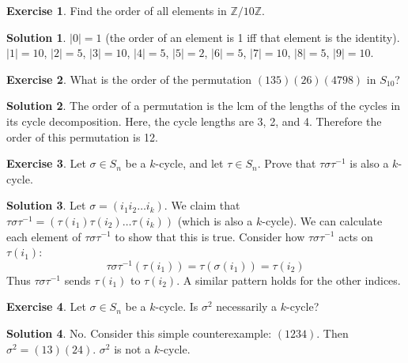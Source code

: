 \documentclass[12pt]{article}
\theoremstyle{definition}
\newtheorem{exercise}{Exercise}
\theoremstyle{definition}
\newtheorem{solution}{Solution}
\newcommand{\Z}{\mathbb{Z}}
\begin{document}
\begin{exercise}
Find the order of all elements in $\Z / 10 \Z$.
\end{exercise}
\begin{solution}
$|0| = 1$ (the order of an element is 1 iff that element is the identity). $|1| = 10$, $|2| = 5$, $|3| = 10$, $|4| = 5$, $|5|=2$, $|6| = 5$, $|7|=10$, $|8|=5$, $|9|=10$.
\end{solution}

\begin{exercise}
What is the order of the permutation $(1 3 5)(2 6)(4 7 9 8)$ in $S_{10}$?
\end{exercise}
\begin{solution}
The order of a permutation is the lcm of the lengths of the cycles in its cycle decomposition. Here, the cycle lengths are 3, 2, and 4. Therefore the order of this permutation is 12.
\end{solution}

\begin{exercise}
Let $\sigma \in S_n$ be a $k$-cycle, and let $\tau \in S_n$. Prove that $\tau \sigma \tau^{-1}$ is also a $k$-cycle.
\end{exercise}
\begin{solution}
Let $\sigma = (i_1 i_2 \ldots i_k)$. We claim that $\tau \sigma \tau^{-1} = (\tau(i_1) \tau(i_2) \ldots \tau(i_k))$ (which is also a $k$-cycle). We can calculate each element of $\tau \sigma \tau^{-1}$ to show that this is true. Consider how $\tau \sigma \tau^{-1}$ acts on $\tau(i_1)$:
\begin{equation}
	\tau \sigma \tau^{-1}(\tau(i_1)) = \tau(\sigma(i_1)) = \tau(i_2)
\end{equation}
Thus $\tau \sigma \tau^{-1}$ sends $\tau(i_1)$ to $\tau(i_2)$. A similar pattern holds for the other indices. 
\end{solution}

\begin{exercise}
Let $\sigma \in S_n$ be a $k$-cycle. Is $\sigma^2$ necessarily a $k$-cycle?
\end{exercise}
\begin{solution}
No. Consider this simple counterexample: $(1 2 3 4)$. Then $\sigma^2 = (1 3) (2 4)$. $\sigma^2$ is not a $k$-cycle.
\end{solution}
\end{document}
